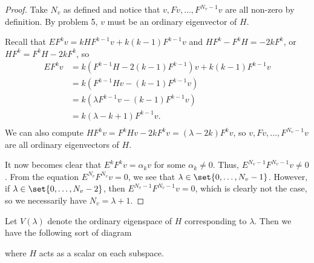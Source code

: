 \documentclass{article}
\begin{document}
\begin{proof}
Take $N_v$ as defined and notice that $v, Fv, \dots, F^{N_v - 1} v$ are all
non-zero by definition. By problem 5, $v$ must be an ordinary eigenvector of
$H$.

Recall that $EF^k v = kHF^{k - 1} v + k(k - 1) F^{k - 1} v$ and $HF^k - F^k H =
-2k F^k$, or $HF^k = F^k H - 2kF^k$, so
\[ \begin{aligned}
EF^k v &= k (F^{k - 1} H - 2 (k - 1) F^{k - 1}) v + k (k - 1) F^{k - 1} v \\
&= k (F^{k - 1} H v - (k - 1) F^{k - 1} v) \\
&= k (\lambda F^{k - 1} v - (k - 1) F^{k - 1} v) \\
&= k (\lambda - k + 1) F^{k - 1} v. \\
\end{aligned} \]
We can also compute $HF^k v = F^k H v - 2k F^k v = (\lambda - 2k) F^k v$, so $v,
Fv, \dots, F^{N_v - 1} v$ are all ordinary eigenvectors of $H$.

It now becomes clear that $E^k F^k v = \alpha_k v$ for some $\alpha_k \neq 0$.
Thus, $E^{N_v - 1} F^{N_v - 1} v \neq 0$. From the equation $E^{N_v} F^{N_v} v =
0$, we see that $\lambda \in \set{0, \dots, N_v - 1}$. However, if $\lambda \in
\set{0, \dots, N_v - 2}$, then $E^{N_v - 1} F^{N_v - 1} v = 0$, which is clearly
not the case, so we necessarily have $N_v = \lambda + 1$.
\end{proof}

\begin{rem}
Let $V(\lambda)$ denote the ordinary eigenspace of $H$ corresponding to
$\lambda$. Then we have the following sort of diagram
\begin{center}
\end{center}
where $H$ acts as a scalar on each subspace.
\end{rem}
\end{document}

